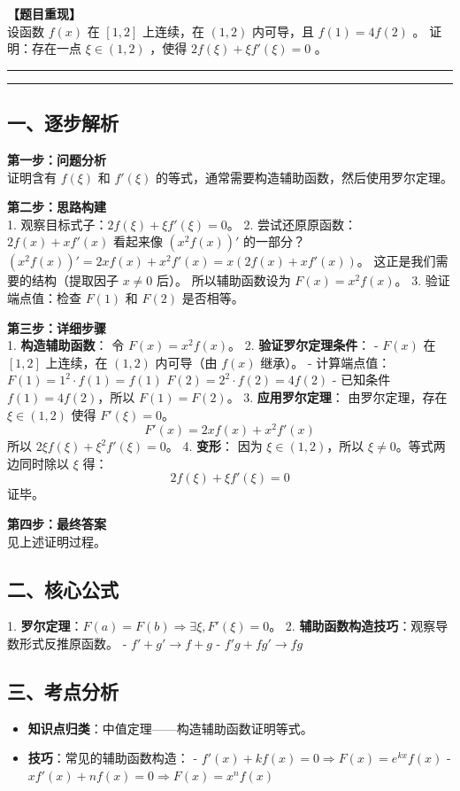 \documentclass[12pt, a4paper]{ctexart}
\newcommand{\AnalysisSeparator}{
    \par\noindent\rule{\textwidth}{0.5pt}\vspace{0.2em}\hrule\vspace{0.5em} %
}
\newenvironment{RedAnalysis}{
    \par
    \color{red} %
}{
    \par
    \color{black} %
}
\begin{document}
\textbf{【题目重现】} \\
设函数 $ f(x) $ 在 $ [1,2] $ 上连续，在 $ (1,2) $ 内可导，且 $ f(1) = 4f(2) $ 。
证明：存在一点 $ \xi \in (1,2) $ ，使得 $ 2f(\xi) + \xi f'(\xi) = 0 $ 。

\AnalysisSeparator

\begin{RedAnalysis}

\subsection*{一、逐步解析}

\textbf{第一步：问题分析} \\
证明含有 $f(\xi)$ 和 $f'(\xi)$ 的等式，通常需要构造辅助函数，然后使用罗尔定理。

\textbf{第二步：思路构建} \\
1. 观察目标式子：$2f(\xi) + \xi f'(\xi) = 0$。
2. 尝试还原原函数：$2f(x) + x f'(x)$ 看起来像 $(x^2 f(x))'$ 的一部分？
   $(x^2 f(x))' = 2x f(x) + x^2 f'(x) = x(2f(x) + xf'(x))$。
   这正是我们需要的结构（提取因子 $x \neq 0$ 后）。
   所以辅助函数设为 $F(x) = x^2 f(x)$。
3. 验证端点值：检查 $F(1)$ 和 $F(2)$ 是否相等。

\textbf{第三步：详细步骤} \\
1. \textbf{构造辅助函数}：
   令 $F(x) = x^2 f(x)$。
2. \textbf{验证罗尔定理条件}：
   - $F(x)$ 在 $[1,2]$ 上连续，在 $(1,2)$ 内可导（由 $f(x)$ 继承）。
   - 计算端点值：
     $F(1) = 1^2 \cdot f(1) = f(1)$
     $F(2) = 2^2 \cdot f(2) = 4f(2)$
   - 已知条件 $f(1) = 4f(2)$，所以 $F(1) = F(2)$。
3. \textbf{应用罗尔定理}：
   由罗尔定理，存在 $\xi \in (1,2)$ 使得 $F'(\xi) = 0$。
   \[ F'(x) = 2x f(x) + x^2 f'(x) \]
   所以 $2\xi f(\xi) + \xi^2 f'(\xi) = 0$。
4. \textbf{变形}：
   因为 $\xi \in (1,2)$，所以 $\xi \neq 0$。等式两边同时除以 $\xi$ 得：
   \[ 2f(\xi) + \xi f'(\xi) = 0 \]
   证毕。

\textbf{第四步：最终答案} \\
见上述证明过程。

\subsection*{二、核心公式}
1. \textbf{罗尔定理}：$F(a)=F(b) \Rightarrow \exists \xi, F'(\xi)=0$。
2. \textbf{辅助函数构造技巧}：观察导数形式反推原函数。
   - $f' + g' \to f+g$
   - $f'g + fg' \to fg$

\subsection*{三、考点分析}
\begin{itemize}
    \item \textbf{知识点归类}：中值定理——构造辅助函数证明等式。
    \item \textbf{技巧}：常见的辅助函数构造：
       - $f'(x) + k f(x) = 0 \Rightarrow F(x) = e^{kx}f(x)$
       - $xf'(x) + n f(x) = 0 \Rightarrow F(x) = x^n f(x)$
\end{itemize}

\end{RedAnalysis}
\end{document}
